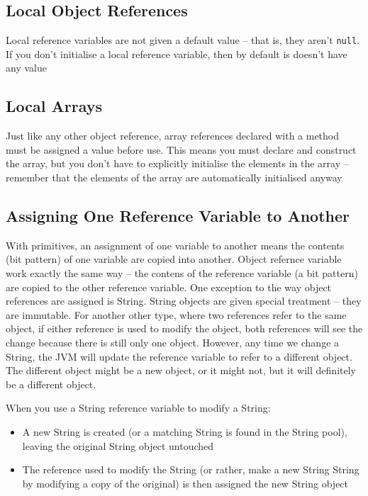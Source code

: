 \subsection{Local Object References}
Local reference variables are not given a default value -- that is, they aren't 
\verb#null#. If you don't initialise a local reference variable, then by 
default is doesn't have any value

\subsection{Local Arrays}
Just like any other object reference, array references declared with a method 
must be assigned a value before use. This means you must declare and construct 
the array, but you don't have to explicitly initialise the elements in the
array -- remember that the elements of the array are automatically initialised 
anyway

\subsection{Assigning One Reference Variable to Another}
With primitives, an assignment of one variable to another means the contents 
(bit pattern) of one variable are copied into another. Object refernce variable 
work exactly the same way -- the contens of the reference variable (a bit 
pattern) are copied to the other reference variable. One exception to the way 
object references are assigned is String. String objects are given special 
treatment -- they are immutable. For another other type, where two references 
refer to the same object, if either reference is used to modify the object, 
both references will see the change because there is still only one object.  
However, any time we change a String, the JVM will update the reference 
variable to refer to a different object. The different object might be a new 
object, or it might not, but it will definitely be a different object.

When you use a String reference variable to modify a String:
\begin{itemize}
    \item A new String is created (or a matching String is found in the String 
    pool), leaving the original String object untouched
    \item The reference used to modify the String (or rather, make a new String 
    String by modifying a copy of the original) is then assigned the new String 
    object
\end{itemize}

